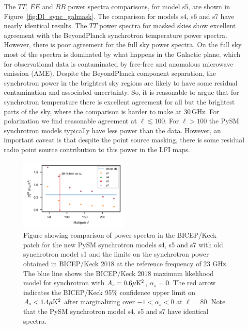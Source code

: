 \documentclass[twocolumn]{aastex631}
\begin{document}
The $TT$, $EE$ and $BB$ power spectra comparisons, for model s5, are shown in Figure~\ref{fig:Dl_sync_galmask}. The comparison for models s4, s6 and s7 have nearly identical results. The $TT$ power spectra for masked skies show excellent agreement with the BeyondPlanck synchrotron temperature power spectra. However, there is poor agreement for the full sky power spectra. On the full sky most of the spectra is dominated by what happens in the Galactic plane, which for observational data is contaminated by free-free and anomalous microwave emission (AME). Despite the BeyondPlanck component separation, the synchrotron power in the brightest sky regions are likely to have some residual contamination and associated uncertainty. So, it is reasonable to argue that for synchrotron temperature there is excellent agreement for all but the brightest parts of the sky, where the comparison is harder to make at 30\,GHz. For polarization we find reasonable agreement at $\ell \lesssim 100$. For $\ell > 100$ the PySM synchrotron models typically have less power than the data. However, an important caveat is that despite the point source masking, there is some residual radio point source contribution to this power in the LFI maps.

\begin{figure}
    \centering
    \includegraphics[width=0.49\textwidth]{figures/Dlcomp_PySM3-4b8_BKpatch.png}
    \caption{Figure showing comparison of power spectra in the BICEP/Keck patch for the new PySM synchrotron models s4, s5 and s7 with old synchrotron model s1 and the limits on the synchrotron power obtained in BICEP/Keck 2018 \citep{Ade:2021} at the reference frequency of 23 GHz. The blue line shows the BICEP/Keck 2018 maximum likelihood model for synchrotron with $A_s=0.6 \mu {\rm K}^2$, $\alpha_s=0$. The red arrow indicates the BICEP/Keck 95\% confidence upper limit on $A_s<1.4 \mu {\rm K}^2$ after marginalizing over $-1<\alpha_s<0$ at $\ell=80$. Note that the PySM synchrotron model s4, s5 and s7 have identical spectra.}
    \label{fig:Dl_sync_BK}
\end{figure}
\end{document}
